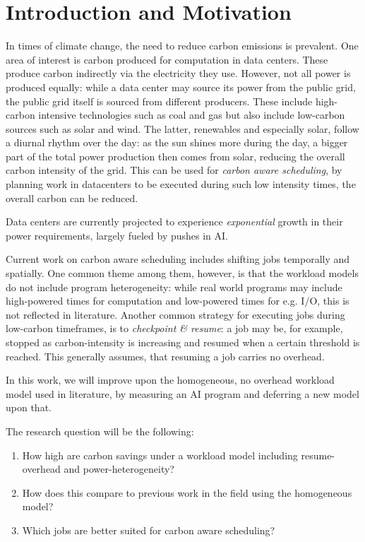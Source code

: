 \chapter{Introduction and Motivation}

In times of climate change, the need to reduce carbon emissions is prevalent. 
One area of interest is carbon produced for computation in data centers. 
These produce carbon indirectly via the electricity they use.
However, not all power is produced equally: while a data center may source its power from the public grid, the public grid itself is sourced from different producers. 
These include high-carbon intensive technologies such as coal and gas but also include low-carbon sources such as solar and wind. 
The latter, renewables and especially solar, follow a diurnal rhythm over the day:
as the sun shines more during the day, a bigger part of the total power production then comes from solar, reducing the overall carbon intensity of the grid.
This can be used for \emph{carbon aware scheduling}, by planning work in datacenters to be executed during such low intensity times, the overall carbon can be reduced.

Data centers are currently projected to experience \emph{exponential} growth in their power requirements, largely fueled by pushes in AI. 

Current work on carbon aware scheduling includes shifting jobs temporally and spatially. 
One common theme among them, however, is that the workload models do not include program heterogeneity: while real world programs may include high-powered times for computation and low-powered times for e.g. I/O, this is not reflected in literature. 
Another common strategy for executing jobs during low-carbon timeframes, is to \emph{checkpoint \& resume}: a job may be, for example, stopped as carbon-intensity is increasing and resumed when a certain threshold is reached. 
This generally assumes, that resuming a job carries no overhead. 

In this work, we will improve upon the homogeneous, no overhead workload model used in literature, by measuring an AI program and deferring a new model upon that.

The research question will be the following:

\begin{enumerate}
    \item How high are carbon savings under a workload model including resume-overhead and power-heterogeneity?
    \item How does this compare to previous work in the field using the homogeneous model?
    \item Which jobs are better suited for carbon aware scheduling?
\end{enumerate}
